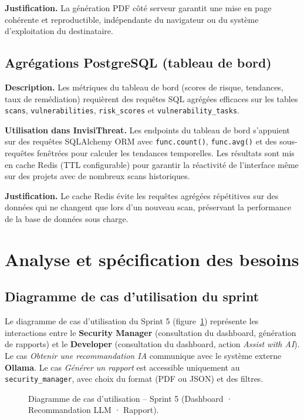 \textbf{Justification.} La génération PDF côté serveur garantit une mise en page cohérente et reproductible, indépendante du navigateur ou du système d'exploitation du destinataire.

\subsection{Agrégations PostgreSQL (tableau de bord)}

\textbf{Description.} Les métriques du tableau de bord (scores de risque, tendances, taux de remédiation) requièrent des requêtes SQL agrégées efficaces sur les tables \texttt{scans}, \texttt{vulnerabilities}, \texttt{risk\_scores} et \texttt{vulnerability\_tasks}.

\textbf{Utilisation dans InvisiThreat.} Les endpoints du tableau de bord s'appuient sur des requêtes SQLAlchemy ORM avec \texttt{func.count()}, \texttt{func.avg()} et des sous-requêtes fenêtrées pour calculer les tendances temporelles. Les résultats sont mis en cache Redis (TTL configurable) pour garantir la réactivité de l'interface même sur des projets avec de nombreux scans historiques.

\textbf{Justification.} Le cache Redis évite les requêtes agrégées répétitives sur des données qui ne changent que lors d'un nouveau scan, préservant la performance de la base de données sous charge.

\section{Analyse et spécification des besoins}

\subsection{Diagramme de cas d'utilisation du sprint}

Le diagramme de cas d'utilisation du Sprint 5 (figure~\ref{fig:sprint5-use-case}) représente les interactions entre le \textbf{Security Manager} (consultation du dashboard, génération de rapports) et le \textbf{Developer} (consultation du dashboard, action \textit{Assist with AI}). Le cas \textit{Obtenir une recommandation IA} communique avec le système externe \textbf{Ollama}. Le cas \textit{Générer un rapport} est accessible uniquement au \texttt{security\_manager}, avec choix du format (PDF ou JSON) et des filtres.

\begin{figure}[H]
\centering
\fbox{\rule{0pt}{2in}\rule{0.9\linewidth}{0pt}}
\caption{Diagramme de cas d'utilisation -- Sprint 5 (Dashboard · Recommandation LLM · Rapport).}
\label{fig:sprint5-use-case}
\end{figure}

